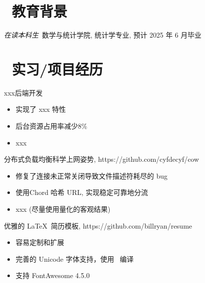 \documentclass{resume}
\begin{document}



\section{\faGraduationCap\  教育背景}
\textit{在读本科生}\ 数学与统计学院, 统计学专业, 预计 2025 年 6 月毕业

\section{\faUsers\ 实习/项目经历}
\role{实习}{经理: 高富帅}
xxx后端开发
\begin{itemize}
  \item 实现了 xxx 特性
  \item 后台资源占用率减少8\%
  \item xxx
\end{itemize}

\begin{onehalfspacing}
  分布式负载均衡科学上网姿势, https://github.com/cyfdecyf/cow
  \begin{itemize}
    \item 修复了连接未正常关闭导致文件描述符耗尽的 bug
    \item 使用Chord 哈希 URL, 实现稳定可靠地分流
    \item xxx (尽量使用量化的客观结果)
  \end{itemize}
\end{onehalfspacing}

\begin{onehalfspacing}
  优雅的 \LaTeX\ 简历模板, https://github.com/billryan/resume
  \begin{itemize}
    \item 容易定制和扩展
    \item 完善的 Unicode 字体支持，使用 \XeLaTeX\ 编译
    \item 支持 FontAwesome 4.5.0
  \end{itemize}
\end{onehalfspacing}
\end{document}
